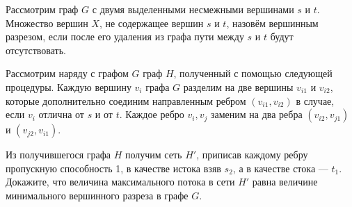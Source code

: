 \documentclass[a4paper,12pt]{article}
\numberwithin{figure}{section}
\begin{document}
\begin{problem}
	Рассмотрим граф $G$ с двумя выделенными несмежными вершинами $s$ и $t$. Множество вершин $X$, не содержащее вершин $s$ и $t$, назовём вершинным разрезом, если после его удаления из графа пути между $s$ и $t$ будут отсутствовать.
	
	Рассмотрим наряду с графом $G$ граф $H$, полученный с помощью следующей процедуры. Каждую вершину $v_i$ графа $G$ разделим на две вершины $v_{i1}$ и $v_{i2}$, которые дополнительно соединим направленным ребром $(v_{i1},v_{i2})$ в случае, если $v_i$ отлична от $s$ и от $t$. Каждое ребро ${v_i,v_j}$ заменим на два ребра $(v_{i2},v_{j1})$ и $(v_{j2},v_{i1})$.
	
	Из получившегося графа $H$ получим сеть $H'$, приписав каждому ребру пропускную способность 1, в качестве истока взяв $s_2$, а в качестве стока — $t_1$. Докажите, что величина максимального потока в сети $H'$ равна величине минимального вершинного разреза в графе $G$.
\end{problem}
\end{document}
